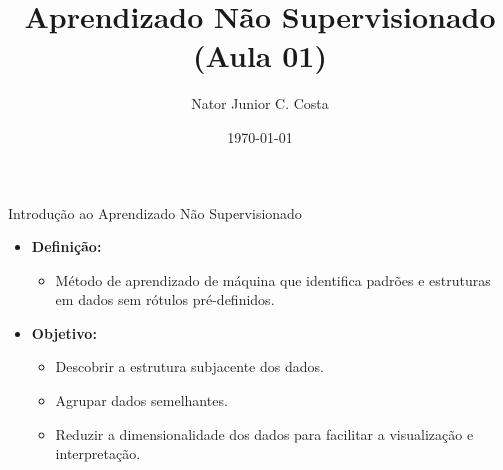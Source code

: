 \documentclass{beamer}
\title{Aprendizado Não Supervisionado (Aula 01)}
\author{Nator Junior C. Costa}
\date{\today}
\begin{document}
\frame{\titlepage}




\begin{frame}{Introdução ao Aprendizado Não Supervisionado}
    \begin{itemize}
        \item \textbf{Definição:} 
        \begin{itemize}
            \item Método de aprendizado de máquina que identifica padrões e estruturas em dados sem rótulos pré-definidos.
        \end{itemize}
        \item \textbf{Objetivo:}
        \begin{itemize}
            \item Descobrir a estrutura subjacente dos dados.
            \item Agrupar dados semelhantes.
            \item Reduzir a dimensionalidade dos dados para facilitar a visualização e interpretação.
        \end{itemize}
    \end{itemize}
\end{frame}
\end{document}
